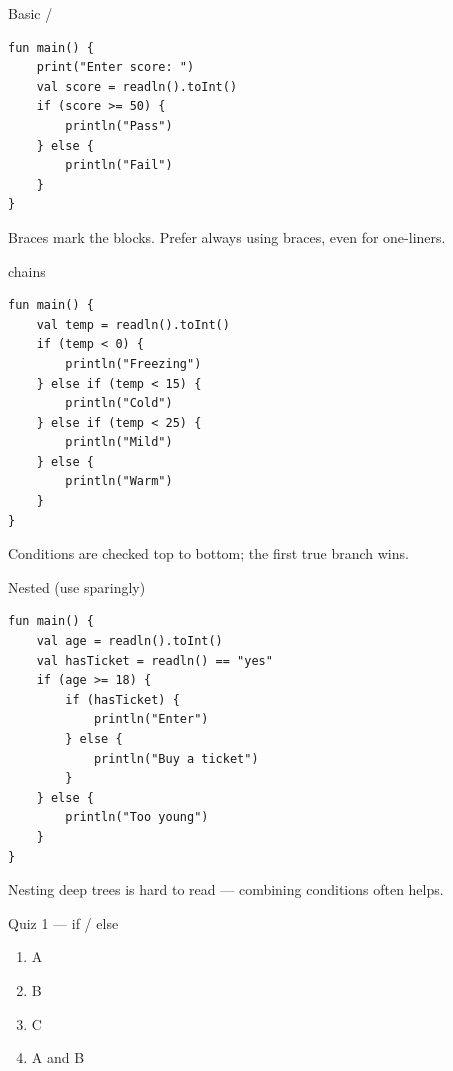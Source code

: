 \documentclass[aspectratio=169,11pt]{beamer}
\begin{document}
    \begin{frame}[fragile]{Basic  / }
        \begin{lstlisting}
fun main() {
    print("Enter score: ")
    val score = readln().toInt()
    if (score >= 50) {
        println("Pass")
    } else {
        println("Fail")
    }
}
        \end{lstlisting}
        \vspace{0.3em}
        Braces \kotlincode{\{ \}} mark the blocks. Prefer always using braces,
        even for one-liners.
    \end{frame}

    \begin{frame}[fragile]{ chains}
        \begin{lstlisting}
fun main() {
    val temp = readln().toInt()
    if (temp < 0) {
        println("Freezing")
    } else if (temp < 15) {
        println("Cold")
    } else if (temp < 25) {
        println("Mild")
    } else {
        println("Warm")
    }
}
        \end{lstlisting}
        \vspace{0.3em}
        Conditions are checked top to bottom; the first true branch wins.
    \end{frame}

    \begin{frame}[fragile]{Nested  (use sparingly)}
        \begin{lstlisting}
fun main() {
    val age = readln().toInt()
    val hasTicket = readln() == "yes"
    if (age >= 18) {
        if (hasTicket) {
            println("Enter")
        } else {
            println("Buy a ticket")
        }
    } else {
        println("Too young")
    }
}
        \end{lstlisting}
        Nesting deep trees is hard to read --- combining conditions often helps.
    \end{frame}

    \begin{frame}{Quiz 1 --- if / else}
        \begin{enumerate}
            \item A
            \item B
            \item C
            \item A and B
        \end{enumerate}
        \quizpause
    \end{frame}
\end{document}
